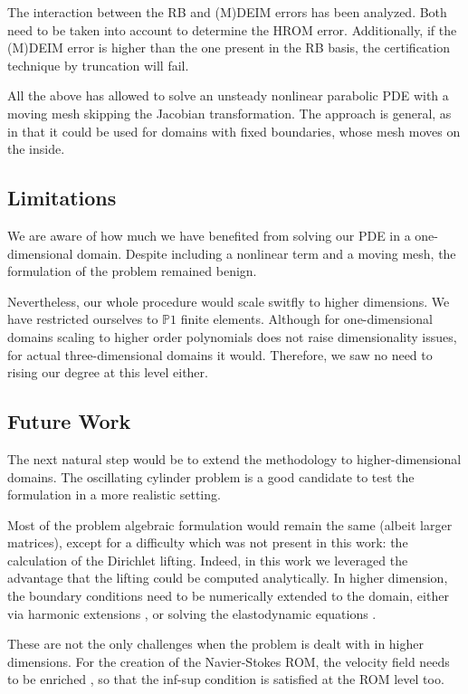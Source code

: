 \documentclass[thesis.tex]{subfiles}
\begin{document}
The interaction between the RB and (M)DEIM errors has been analyzed.
Both need to be taken into account to determine the HROM error.
Additionally, if the (M)DEIM error is higher than the one present in the RB basis,
the certification technique by truncation will fail.

All the above has allowed to solve an unsteady nonlinear parabolic PDE 
with a moving mesh skipping the Jacobian transformation. 
The approach is general, as in that it could be used for domains with fixed boundaries, 
whose mesh moves on the inside.

\subsection{Limitations}
We are aware of how much we have benefited from solving our PDE in a one-dimensional domain.
Despite including a nonlinear term and a moving mesh,
the formulation of the problem remained benign. 

Nevertheless, our whole procedure would scale switfly to higher dimensions.
We have restricted ourselves to $\mathbb{P}1$ finite elements.
Although for one-dimensional domains scaling to higher order polynomials does not
raise dimensionality issues, for actual three-dimensional domains it would.
Therefore, we saw no need to rising our degree at this level either.

\subsection{Future Work}
The next natural step would be to extend the methodology to higher-dimensional domains.
The oscillating cylinder problem is a good candidate 
to test the formulation in a more realistic setting.

Most of the problem algebraic formulation would remain the same (albeit larger matrices),
except for a difficulty which was not present in this work: 
the calculation of the Dirichlet lifting. 
Indeed, in this work we leveraged the advantage that the lifting could be computed analytically.
In higher dimension, the boundary conditions need to be numerically extended to the domain,
either via harmonic extensions
\cite{formaggiaALE},
or solving the elastodynamic equations
\cite{1995_farhat_elasticEquations}.

These are not the only challenges when the problem is dealt with in higher dimensions.
For the creation of the Navier-Stokes ROM, the velocity field needs to be enriched
\cite{supremizers},
so that the inf-sup condition is satisfied at the ROM level too.
\end{document}
